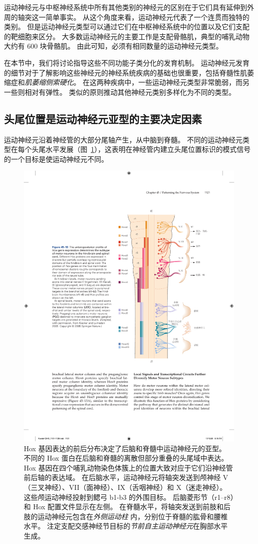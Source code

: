 运动神经元与中枢神经系统中所有其他类别的神经元的区别在于它们具有延伸到外周的轴突这一简单事实。
从这个角度来看，运动神经元代表了一个连贯而独特的类别。
但是运动神经元类型可以通过它们在中枢神经系统中的位置以及它们支配的靶细胞来区分。
大多数运动神经元的主要工作是支配骨骼肌，典型的哺乳动物大约有 600 块骨骼肌。
由此可知，必须有相同数量的运动神经元类型。


在本节中，我们将讨论指导这些不同功能子类分化的发育机制。
运动神经元发育的细节对于了解影响这些神经元的神经系统疾病的基础也很重要，包括脊髓性肌萎缩症和\textit{肌萎缩侧索硬化}。
在这两种疾病中，一些运动神经元类型非常脆弱，而另一些则相对有弹性。
类似的原则推动其他神经元类别多样化为不同的类型。



\subsection{头尾位置是运动神经元亚型的主要决定因素}

运动神经元沿着神经管的大部分尾轴产生，从中脑到脊髓。
不同的运动神经元类型在每个头尾水平发展（图~\ref{fig:45_10}），这表明在神经管内建立头尾位置标识的模式信号的一个目标是使运动神经元不同。


\begin{figure}[htbp]
	\centering
	\includegraphics[width=0.71\linewidth]{chap45/fig_45_10}
	\caption{Hox 基因表达的前后分布决定了后脑和脊髓中运动神经元的亚型。
		不同的 Hox 蛋白在后脑和脊髓的离散但部分重叠的头尾域中表达。
		Hox 基因在四个哺乳动物染色体簇上的位置大致对应于它们沿神经管前后轴的表达域。
		在后脑水平，运动神经元将轴突发送到颅神经 V（三叉神经）、VII（面神经）、IX（舌咽神经）和 X（迷走神经）。
		这些颅运动神经投射到鳃弓 b1-b3 的外围目标。
		后脑菱形节（r1–r8）和 Hox 配置文件显示在左侧。
		在脊髓水平，将轴突发送到前肢和后肢的运动神经元包含在\textit{外侧运动柱} 内，分别位于脊髓的肱骨和腰椎水平。
		注定支配交感神经节目标的\textit{节前自主运动神经元}在胸部水平生成\cite{kiecker2005compartments}。 }
	\label{fig:45_10}
\end{figure}


